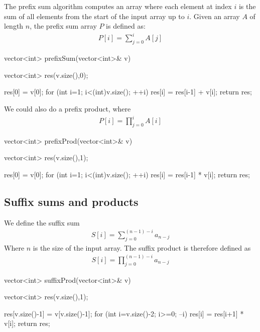 \documentclass{report}
\begin{document}
\pagebreak 
{}
\bigbreak \noindent 
The prefix sum algorithm computes an array where each element at index $i$ is the sum of all elements from the start of the input array up to $i$. Given an array $A$ of length $n$, the prefix sum array $P$ is defined as:
\begin{align*}
    P[i] = \sum_{j=0}^{i}A[j]
\end{align*}
\bigbreak \noindent 
\begin{cppcode}
    vector<int> prefixSum(vector<int>& v) {
        vector<int> res(v.size(),0);

        res[0] = v[0];
        for (int i=1; i<(int)v.size(); ++i) {
            res[i] = res[i-1] + v[i];
        }
        return res;
    }
\end{cppcode}
\bigbreak \noindent 
We could also do a prefix product, where
\begin{align*}
    P[i] = \prod_{j=0}^{i} A[i]
\end{align*}
\bigbreak \noindent 
\begin{cppcode}
    vector<int> prefixProd(vector<int>& v) {
        vector<int> res(v.size(),1);

        res[0] = v[0];
        for (int i=1; i<(int)v.size(); ++i) {
            res[i] = res[i-1] * v[i];
        }
        return res;
    }
\end{cppcode}

\bigbreak \noindent 
\subsection{Suffix sums and products}
\bigbreak \noindent 
We define the suffix sum
\begin{align*}
    S[i] = \sum_{j=0}^{(n-1)-i} a_{n-j}
\end{align*}
Where $n$ is the size of the input array. The suffix product is therefore defined as
\begin{align*}
    S[i] = \prod_{j=0}^{(n-1)-i}a_{n-j}
\end{align*}
\bigbreak \noindent 
\begin{cppcode}
    vector<int> suffixProd(vector<int>& v) {
        vector<int> res(v.size(),1);

        res[v.size()-1] = v[v.size()-1];
        for (int i=v.size()-2; i>=0; --i) {
            res[i] = res[i+1] * v[i];
        }
        return res;
    }
\end{cppcode}
\end{document}
